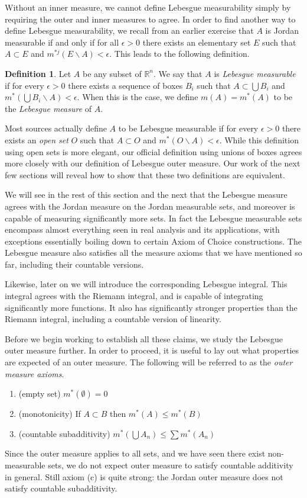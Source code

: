 \documentclass[11pt,oneside]{amsbook}
\renewcommand{\setminus}{\smallsetminus}
\newcommand{\RR}{{\mathbb R}}
\theoremstyle{definition}
\theoremstyle{plain}
\theoremstyle{definition}
\newtheorem{defn}[thm]{Definition}
\theoremstyle{remark}
\numberwithin{equation}{section}
\numberwithin{figure}{section}
\begin{document}
Without an inner measure, we cannot define Lebesgue measurability simply by requiring the outer and inner measures to agree. In order to find another way to define Lebesgue measurability, we recall from an earlier exercise that $A$ is Jordan measurable if and only if for all $\epsilon>0$ there exists an elementary set $E$ such that $A\subset E$ and $m^{*j}(E\setminus A)<\epsilon$. This leads to the following definition.

\begin{defn}
  Let $A$ be any subset of $\RR^n$. We say that $A$ is \emph{Lebesgue measurable} if for every $\epsilon>0$ there exists a sequence of boxes $B_i$ such that $A\subset\bigcup B_i$ and $m^*(\bigcup B_i\setminus A)<\epsilon$. When this is the case, we define $m(A)=m^*(A)$ to be the \emph{Lebesgue measure} of $A$.
\end{defn}

Most sources actually define $A$ to be Lebesgue measurable if for every $\epsilon>0$ there exists an \emph{open set} $O$ such that $A\subset O$ and $m^*(O\setminus A)<\epsilon$. While this definition using open sets is more elegant, our official definition using unions of boxes agrees more closely with our definition of Lebesgue outer measure. Our work of the next few sections will reveal how to show that these two definitions are equivalent.

We will see in the rest of this section and the next that the Lebesgue measure agrees with the Jordan measure on the Jordan measurable sets, and moreover is capable of measuring significantly more sets. In fact the Lebesgue measurable sets encompass almost everything seen in real analysis and its applications, with exceptions essentially boiling down to certain Axiom of Choice constructions. The Lebesgue measure also satisfies all the measure axioms that we have mentioned so far, including their countable versions.

Likewise, later on we will introduce the corresponding Lebesgue integral. This integral agrees with the Riemann integral, and is capable of integrating significantly more functions. It also has significantly stronger properties than the Riemann integral, including a countable version of linearity.

Before we begin working to establish all these claims, we study the Lebesgue outer measure further. In order to proceed, it is useful to lay out what properties are expected of an outer measure. The following will be referred to as the \emph{outer measure axioms}.
\begin{enumerate}
\item (empty set) $m^*(\emptyset)=0$
\item (monotonicity) If $A\subset B$ then $m^*(A)\leq m^*(B)$
\item (countable subadditivity) $m^*(\bigcup A_n)\leq\sum m^*(A_n)$
\end{enumerate}
Since the outer measure applies to all sets, and we have seen there exist non-measurable sets, we do not expect outer measure to satisfy countable additivity in general. Still axiom (c) is quite strong: the Jordan outer measure does not satisfy countable subadditivity.
\end{document}
